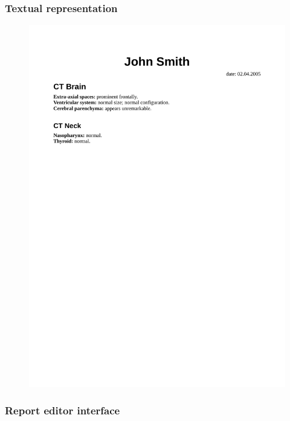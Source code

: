 \documentclass{beamer}
\begin{document}
\begin{frame}
\frametitle{Textual representation}
\begin{figure}
	\centering
	\includegraphics[width=1\linewidth]{../rendered-report}
	\label{fig:rendered-report}
\end{figure}
\end{frame}

\begin{frame}
\frametitle{Report editor interface}
\end{frame}
\end{document}
